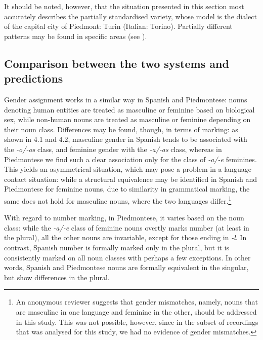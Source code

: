 \documentclass[output=paper]{langscibook}
\begin{document}
It should be noted, however, that the situation presented in this section most accurately describes the partially standardised variety, whose model is the dialect of the capital city of Piedmont: Turin (Italian: Torino). Partially different patterns may be found in specific areas (see \citealt{Berruto1974,Telmon2001,RegisRivoirainpress}). 

\subsection{Comparison between the two systems and predictions}

Gender assignment works in a similar way in Spanish and Piedmontese: nouns denoting human entities are treated as masculine or feminine based on biological sex, while non-human nouns are treated as masculine or feminine depending on their noun class. Differences may be found, though, in terms of marking: as shown in 4.1 and 4.2, masculine gender in Spanish tends to be associated with the \textit{{}-o/-os} class, and feminine gender with the \textit{{}-a/-as} class, whereas in Piedmontese we find such a clear association only for the class of \textit{{}-a/-e} feminines. This yields an asymmetrical situation, which may pose a problem in a language contact situation: while a structural equivalence may be identified in Spanish and Piedmontese for feminine nouns, due to similarity in grammatical marking, the same does not hold for masculine nouns, where the two languages differ.\footnote{An anonymous reviewer suggests that gender mismatches, namely, nouns that are masculine in one language and feminine in the other, should be addressed in this study. This was not possible, however, since in the subset of recordings that was analysed for this study, we had no evidence of gender mismatches.}

With regard to number marking, in Piedmontese, it varies based on the noun class: while the \textit{-a/-e} class of feminine nouns overtly marks number (at least in the plural), all the other nouns are invariable, except for those ending in \textit{{}-l}. In contrast, Spanish number is formally marked only in the plural, but it is consistently marked on all noun classes with perhaps a few exceptions. In other words, Spanish and Piedmontese nouns are formally equivalent in the singular, but show differences in the plural. 
\end{document}
